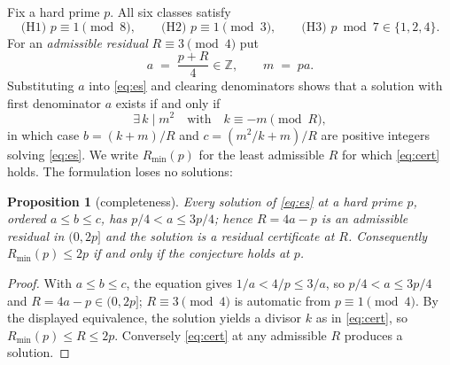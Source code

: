 \documentclass[11pt]{article}
\theoremstyle{plain}
\newtheorem{proposition}[theorem]{Proposition}
\theoremstyle{remark}
\theoremstyle{plain}
\numberwithin{equation}{section}
\begin{document}
Fix a hard prime $p$. All six classes satisfy
\[
  \text{(H1) } p \equiv 1 \pmod 8, \qquad
  \text{(H2) } p \equiv 1 \pmod 3, \qquad
  \text{(H3) } p \bmod 7 \in \{1, 2, 4\}.
\]
For an \emph{admissible residual} $R \equiv 3 \pmod 4$ put
\[
  a \;=\; \frac{p+R}{4} \in \mathbb{Z}, \qquad m \;=\; pa.
\]
Substituting $a$ into \eqref{eq:es} and clearing denominators shows that a
solution with first denominator $a$ exists if and only if
\begin{equation}\label{eq:cert}
  \exists\, k \mid m^2 \quad\text{with}\quad k \equiv -m \pmod R,
\end{equation}
in which case $b = (k+m)/R$ and $c = (m^2/k + m)/R$ are positive integers
solving \eqref{eq:es}. We write $R_{\min}(p)$ for the least admissible $R$
for which \eqref{eq:cert} holds. The formulation loses no solutions:

\begin{proposition}[completeness]\label{prop:complete}
Every solution of \eqref{eq:es} at a hard prime $p$, ordered
$a \le b \le c$, has $p/4 < a \le 3p/4$; hence $R = 4a - p$ is an
admissible residual in $(0, 2p]$ and the solution is a residual
certificate at $R$. Consequently $R_{\min}(p) \le 2p$ if and only if
the conjecture holds at $p$.
\end{proposition}

\begin{proof}
With $a \le b \le c$, the equation gives $1/a < 4/p \le 3/a$, so
$p/4 < a \le 3p/4$ and $R = 4a - p \in (0, 2p]$; $R \equiv 3 \pmod 4$
is automatic from $p \equiv 1 \pmod 4$. By the displayed equivalence,
the solution yields a divisor $k$ as in \eqref{eq:cert}, so
$R_{\min}(p) \le R \le 2p$. Conversely \eqref{eq:cert} at any
admissible $R$ produces a solution.
\end{proof}
\end{document}
